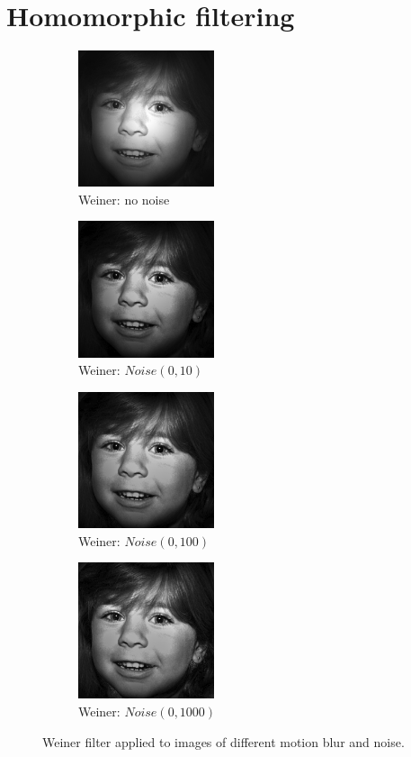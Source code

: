 \documentclass[letterpaper]{article}
\begin{document}
\section{Homomorphic filtering}
\begin{figure}[hbtp]
  \centering
  \begin{subfigure}{4cm}
    \includegraphics[width=4cm]{images/girl.png}
    \caption{Weiner: no noise}
  \end{subfigure}
  \begin{subfigure}{4cm}
    \includegraphics[width=4cm]{images/girl_homo_0_8_1_2_1_8.png}
    \caption{Weiner: $Noise(0,10)$}
  \end{subfigure}
  \begin{subfigure}{4cm}
    \includegraphics[width=4cm]{images/girl_homo_0_5_1_2_1_8.png}
    \caption{Weiner: $Noise(0,100)$}
  \end{subfigure}
  \begin{subfigure}{4cm}
    \includegraphics[width=4cm]{images/girl_homo_best.png}
    \caption{Weiner: $Noise(0,1000)$}
  \end{subfigure}
  \caption{Weiner filter applied to images of different motion blur and noise.}
  \label{fig:weiner}
\end{figure}
\end{document}
